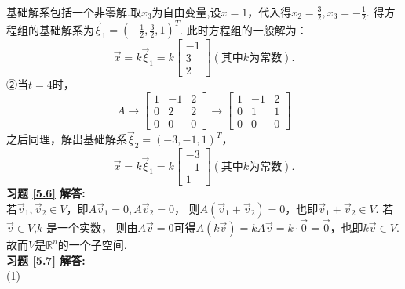 \documentclass[a4paper]{book}
\begin{document}
基础解系包括一个非零解.取$x_3$为自由变量,设$x=1$，代入得$x_2=\frac{3}{2},x_3=-\frac{1}{2}$.
得方程组的基础解系为$\vec{\xi}_1=(-\frac{1}{2},\frac{3}{2},1)^T$.
此时方程组的一般解为：
\begin{equation*}
\vec{x}=k\vec{\xi}_1=
k\begin{bmatrix}-1\\3\\2\end{bmatrix}(\text{其中}k\text{为常数}).
\end{equation*}
②当$t=4$时，
\begin{equation*}
A \rightarrow
   \begin{bmatrix}1&-1&2\\0&2&2\\0&0&0\end{bmatrix}
   \rightarrow
   \begin{bmatrix}1&-1&2\\0&1&1\\0&0&0\end{bmatrix}
\end{equation*}
之后同理，解出基础解系$\vec{\xi}_2=(-3,-1,1)^T$，
\begin{equation*}
\vec{x}=k\vec{\xi}_1=
k\begin{bmatrix}-3\\-1\\1\end{bmatrix}(\text{其中}k\text{为常数}).
\end{equation*}
\textbf{习题 \ref{5.6} 解答:}\\
若$\vec{v}_1,\vec{v}_2\in V$，即$A\vec{v}_1=0,A\vec{v}_2=0$，
则$A(\vec{v}_1+\vec{v}_2)=0$，也即$\vec{v}_1+\vec{v}_2\in V$. 若$\vec{v}\in V$,$k$ 是一个实数，
则由$A\vec{v}=0$可得$A(k\vec{v})=kA\vec{v}=k\cdot\vec{0}=\vec{0}$，也即$k\vec{v}\in V$.
故而$V$是$\mathbb{R}^n$的一个子空间.\\
\textbf{习题 \ref{5.7} 解答:}\\
(1)
\end{document}
